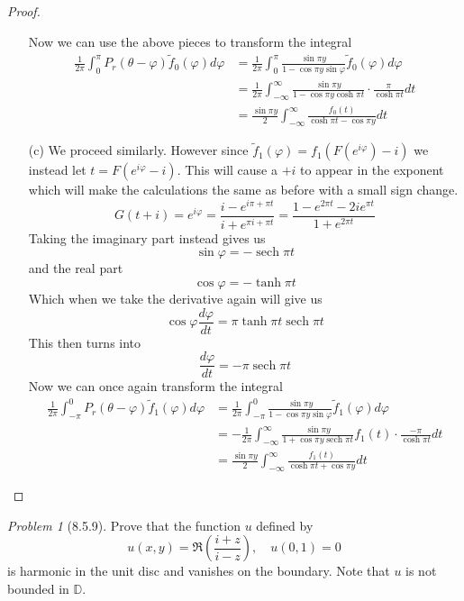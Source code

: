 \documentclass[10pt]{article}
\newcommand{\sk}{\vskip 10mm}
\newcommand{\bb}[1]{\mathbb{#1}}
\newcommand{\wt}[1]{\widetilde{#1}}
\DeclareMathOperator{\sech}{sech}
\theoremstyle{remark}
\newtheorem{problem}{Problem}
\theoremstyle{remark}
\begin{document}
\begin{proof}
\begin{enumerate}
    Now we can use the above pieces to transform the integral
    \begin{align*}
      \frac{1}{2\pi}\int_0^\pi P_r(\theta-\varphi)\wt{f}_0(\varphi)d\varphi&=\frac{1}{2\pi}\int_0^\pi\frac{\sin\pi y}{1-\cos\pi y\sin\varphi}\wt{f}_0(\varphi)d\varphi\\
                                                        &=\frac{1}{2\pi}\int_{-\infty}^\infty\frac{\sin\pi y}{1-\cos\pi y\cosh\pi t}\cdot\frac{\pi}{\cosh\pi t}dt\\
                                                        &=\frac{\sin\pi y}{2}\int_{-\infty}^\infty\frac{f_0(t)}{\cosh\pi t-\cos\pi y}dt
    \end{align*}
  \item[(c)] We proceed similarly. However since $\wt{f}_1(\varphi)=f_1(F(e^{i\varphi})-i)$ we instead
    let $t=F(e^{i\varphi}-i)$. This will cause a $+i$ to appear in the exponent which will make the
    calculations the same as before with a small sign change.
    \[
      G(t+i)=e^{i\varphi}=\frac{i-e^{i\pi+\pi t}}{i+e^{\pi i+\pi t}} = \frac{1-e^{2\pi t}-2ie^{\pi t}}{1+e^{2\pi t}}
    \]
    Taking the imaginary part instead gives us
    \[
      \sin\varphi = -\sech\pi t
    \]
    and the real part
    \[
      \cos\varphi = -\tanh\pi t
    \]
    Which when we take the derivative again will give us
    \[
      \cos\varphi\frac{d\varphi}{dt}=\pi\tanh\pi t\sech\pi t
    \]
    This then turns into
    \[
      \frac{d\varphi}{dt}=-\pi\sech\pi t
    \]
    Now we can once again transform the integral
    \begin{align*}
      \frac{1}{2\pi}\int_{-\pi}^0 P_r(\theta-\varphi)\wt{f}_1(\varphi)d\varphi&=\frac{1}{2\pi}\int_{-\pi}^0\frac{\sin\pi y}{1-\cos\pi y\sin\varphi}\wt{f}_1(\varphi)d\varphi\\
                                                                         &= -\frac{1}{2\pi}\int_{-\infty}^\infty\frac{\sin\pi y}{1+\cos\pi y\sech\pi t}f_1(t)\cdot\frac{-\pi}{\cosh\pi t}dt\\
                                                                         &=\frac{\sin\pi y}{2}\int_{-\infty}^\infty\frac{f_1(t)}{\cosh\pi t+\cos\pi y}dt
    \end{align*}
  \end{enumerate}
\end{proof}

\sk

\begin{problem}[8.5.9]
  Prove that the function $u$ defined by
  \[
    u(x,y)=\Re(\frac{i+z}{i-z}),\quad u(0,1)=0
  \]
  is harmonic in the unit disc and vanishes on the boundary. Note that
  $u$ is not bounded in $\bb{D}$.
\end{problem}
\end{document}
